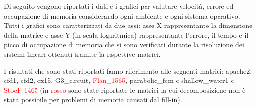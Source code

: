 Di seguito vengono riportati i dati e i grafici per valutare velocità, errore ed occupazione di memoria considerando ogni ambiente 
e ogni sistema operativo. 
Tutti i grafici sono caratterizzati da due assi: asse X rappresentante la dimensione della matrice e asse Y 
(in scala logaritmica) rappresentante l'errore, il tempo e  il picco di occupazione di memoria che si sono verificati durante la risoluzione dei sistemi lineari ottenuti tramite la rispettive matrici.


I risultati che sono stati riportati fanno riferimento alle seguenti matrici: apache2, cfd1, cfd2, ex15, G3\_circuit, \textcolor{red}{Flan\_1565}, parabolic\_fem e shallow\_water1 e \textcolor{red}{StocF-1465} (in \textcolor{red}{rosso} sono state riportate le matrici la cui decomposizione non è stata possibile per problemi di memoria causati dal fill-in).
